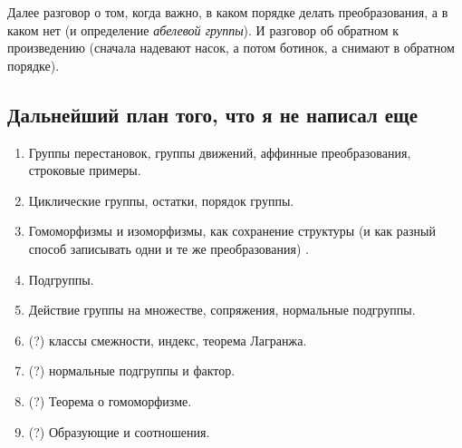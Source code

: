 	Далее разговор о том, когда важно, в каком порядке делать преобразования, а в каком нет (и определение \emph{абелевой группы}). И разговор об обратном к произведению (сначала надевают насок, а потом ботинок, а снимают в обратном порядке). 

	

	\subsection{Дальнейший план того, что я не написал еще}

	\begin{enumerate}
		\item Группы перестановок, группы движений, аффинные преобразования, строковые примеры.  
		\item Циклические группы, остатки, порядок группы. 
		\item Гомоморфизмы и изоморфизмы, как сохранение структуры (и как разный способ записывать одни и те же преобразования) . 
		\item Подгруппы.
		\item Действие группы на множестве, сопряжения, нормальные подгруппы. 

		\item (?) классы смежности, индекс, теорема Лагранжа. 
		\item (?) нормальные подгруппы и фактор. 
		\item (?) Теорема о гомоморфизме. 
		\item (?) Образующие и соотношения. 
	\end{enumerate}



